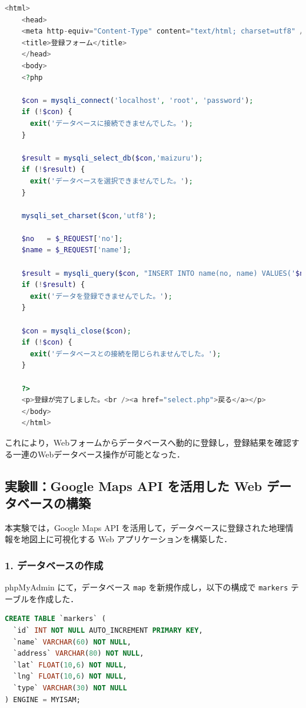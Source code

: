 \begin{lstlisting}[language=php]
    <html>
    <head>
    <meta http-equiv="Content-Type" content="text/html; charset=utf8" />
    <title>登録フォーム</title>
    </head>
    <body>
    <?php
    
    $con = mysqli_connect('localhost', 'root', 'password');
    if (!$con) {
      exit('データベースに接続できませんでした。');
    }
    
    $result = mysqli_select_db($con,'maizuru');
    if (!$result) {
      exit('データベースを選択できませんでした。');
    }
    
    mysqli_set_charset($con,'utf8');
    
    $no   = $_REQUEST['no'];
    $name = $_REQUEST['name'];
    
    $result = mysqli_query($con, "INSERT INTO name(no, name) VALUES('$no', '$name')");
    if (!$result) {
      exit('データを登録できませんでした。');
    }
    
    $con = mysqli_close($con);
    if (!$con) {
      exit('データベースとの接続を閉じられませんでした。');
    }
    
    ?>
    <p>登録が完了しました。<br /><a href="select.php">戻る</a></p>
    </body>
    </html>
\end{lstlisting}

これにより，Webフォームからデータベースへ動的に登録し，登録結果を確認する一連のWebデータベース操作が可能となった．

\subsection*{実験Ⅲ：Google Maps API を活用した Web データベースの構築}

本実験では，Google Maps API を活用して，データベースに登録された地理情報を地図上に可視化する Web アプリケーションを構築した．

\subsubsection*{1. データベースの作成}

phpMyAdmin にて，データベース \texttt{map} を新規作成し，以下の構成で \texttt{markers} テーブルを作成した．

\begin{lstlisting}[language=SQL]
CREATE TABLE `markers` ( 
  `id` INT NOT NULL AUTO_INCREMENT PRIMARY KEY, 
  `name` VARCHAR(60) NOT NULL, 
  `address` VARCHAR(80) NOT NULL, 
  `lat` FLOAT(10,6) NOT NULL, 
  `lng` FLOAT(10,6) NOT NULL, 
  `type` VARCHAR(30) NOT NULL 
) ENGINE = MYISAM;
\end{lstlisting}

